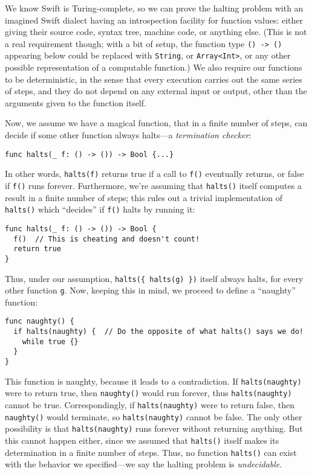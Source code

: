 \documentclass[../generics]{subfiles}
\begin{document}
We know Swift is Turing-complete, so we can prove the halting problem with an imagined Swift dialect having an introspection facility for function values: either giving their source code, syntax tree, machine code, or anything else. (This is not a real requirement though; with a bit of setup, the function type \texttt{() -> ()} appearing below could be replaced with \texttt{String}, or \texttt{Array<Int>}, or any other possible representation of a computable function.) We also require our functions to be deterministic, in the sense that every execution carries out the same series of steps, and they do not depend on any external input or output, other than the arguments given to the function itself.

Now, we assume we have a magical function, that in a finite number of steps, can decide if some other function always halts---a \emph{termination checker}:
\begin{Verbatim}
func halts(_ f: () -> ()) -> Bool {...}
\end{Verbatim}
In other words, \texttt{halts(f)} returns true if a call to \texttt{f()} eventually returns, or false if \texttt{f()} runs forever. Furthermore, we're assuming that \texttt{halts()} itself computes a result in a finite number of steps; this rules out a trivial implementation of \texttt{halts()} which ``decides'' if \texttt{f()} halts by running it:
\begin{Verbatim}
func halts(_ f: () -> ()) -> Bool {
  f()  // This is cheating and doesn't count!
  return true
}
\end{Verbatim}
Thus, under our assumption, \verb|halts({ halts(g) })| itself always halts, for every other function \texttt{g}. Now, keeping this in mind, we proceed to define a ``naughty'' function:
\begin{Verbatim}
func naughty() {
  if halts(naughty) {  // Do the opposite of what halts() says we do!
    while true {}
  }
}
\end{Verbatim}

This function is naughty, because it leads to a contradiction. If \texttt{halts(naughty)} were to return true, then \texttt{naughty()} would run forever, thus \texttt{halts(naughty)} cannot be true. Correspondingly, if \texttt{halts(naughty)} were to return false, then \texttt{naughty()} would terminate, so \texttt{halts(naughty)} cannot be false. The only other possibility is that \texttt{halts(naughty)} runs forever without returning anything. But this cannot happen either, since we assumed that \texttt{halts()} itself makes its determination in a finite number of steps. Thus, no function \texttt{halts()} can exist with the behavior we specified---we say the halting problem is \emph{undecidable}.
\end{document}
